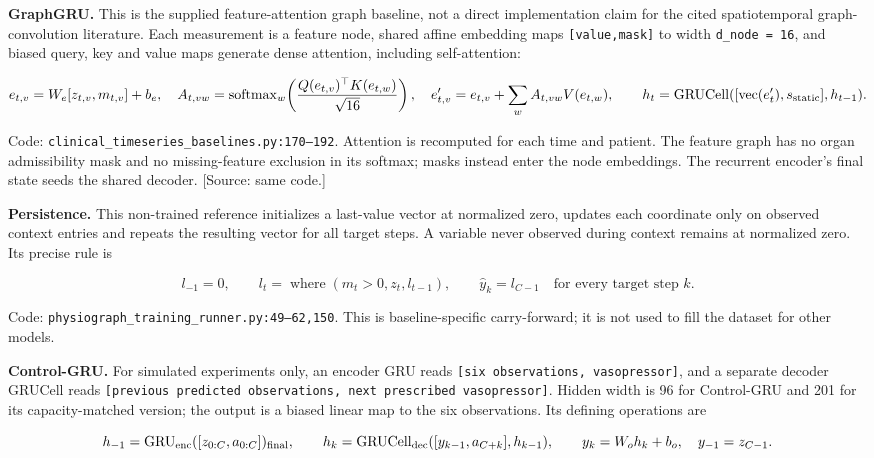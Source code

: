 \textbf{GraphGRU.} This is the supplied feature-attention graph baseline, not a direct implementation claim for the cited spatiotemporal graph-convolution literature. Each measurement is a feature node, shared affine embedding maps \texttt{[value,\allowbreak{}mask]} to width \texttt{d\_\allowbreak{}node =\allowbreak{} 16}, and biased query, key and value maps generate dense attention, including self-attention:

\[
e_{t,v}=W_e[z_{t,v},m_{t,v}]+b_e,\quad
A_{t,vw}=\operatorname{softmax}_{w}\!\left(\frac{Q(e_{t,v})^\top K(e_{t,w})}{\sqrt{16}}\right),\quad
e'_{t,v}=e_{t,v}+\sum_w A_{t,vw}V(e_{t,w}),\qquad
h_t=\operatorname{GRUCell}([\operatorname{vec}(e'_t),s_{\rm static}],h_{t-1}).
\]


Code: \texttt{clinical\_\allowbreak{}timeseries\_\allowbreak{}baselines.\allowbreak{}py:\allowbreak{}170–\allowbreak{}192}. Attention is recomputed for each time and patient. The feature graph has no organ admissibility mask and no missing-feature exclusion in its softmax; masks instead enter the node embeddings. The recurrent encoder's final state seeds the shared decoder. [Source: same code.]

\textbf{Persistence.} This non-trained reference initializes a last-value vector at normalized zero, updates each coordinate only on observed context entries and repeats the resulting vector for all target steps. A variable never observed during context remains at normalized zero. Its precise rule is

\[
l_{-1}=0,\qquad l_t=\operatorname{where}(m_t>0,z_t,l_{t-1}),\qquad
\widehat y_k=l_{C-1}\quad\text{for every target step }k.
\]


Code: \texttt{physiograph\_\allowbreak{}training\_\allowbreak{}runner.\allowbreak{}py:\allowbreak{}49–\allowbreak{}62,\allowbreak{}150}. This is baseline-specific carry-forward; it is not used to fill the dataset for other models.

\textbf{Control-GRU.} For simulated experiments only, an encoder GRU reads \texttt{[six observations,\allowbreak{} vasopressor]}, and a separate decoder GRUCell reads \texttt{[previous predicted observations,\allowbreak{} next prescribed vasopressor]}. Hidden width is 96 for Control-GRU and 201 for its capacity-matched version; the output is a biased linear map to the six observations. Its defining operations are

\[
h_{-1}=\operatorname{GRU}_{\rm enc}([z_{0:C},a_{0:C}])_{\rm final},\qquad
h_k=\operatorname{GRUCell}_{\rm dec}([y_{k-1},a_{C+k}],h_{k-1}),\qquad
y_k=W_oh_k+b_o,\quad y_{-1}=z_{C-1}.
\]


